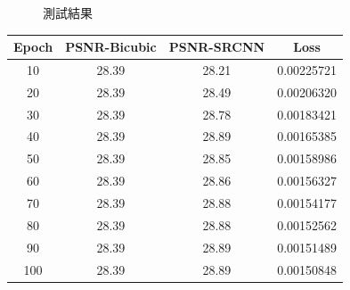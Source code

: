 \documentclass[11pt,UTF8]{ctexart}
\begin{document}
\begin{figure}[H]
\centering  %
\caption{測試結果}
\label{Fig.main}
\end{figure}

\begin{center}
\begin{tabular}{cccc}
\hline
Epoch & PSNR-Bicubic & PSNR-SRCNN & Loss  \\
\hline
 10 & 28.39 & 28.21 & 0.00225721 \\
 20 & 28.39 & 28.49 & 0.00206320 \\
 30 & 28.39 & 28.78 & 0.00183421 \\
 40 & 28.39 & 28.89 & 0.00165385 \\
 50 & 28.39 & 28.85 & 0.00158986 \\
 60 & 28.39 & 28.86 & 0.00156327 \\
 70 & 28.39 & 28.88 & 0.00154177 \\
 80 & 28.39 & 28.88 & 0.00152562 \\
 90 & 28.39 & 28.89 & 0.00151489 \\
 100 & 28.39 & 28.89 & 0.00150848 \\
\hline
\end{tabular}
\end{center}
\newpage
\end{document}
